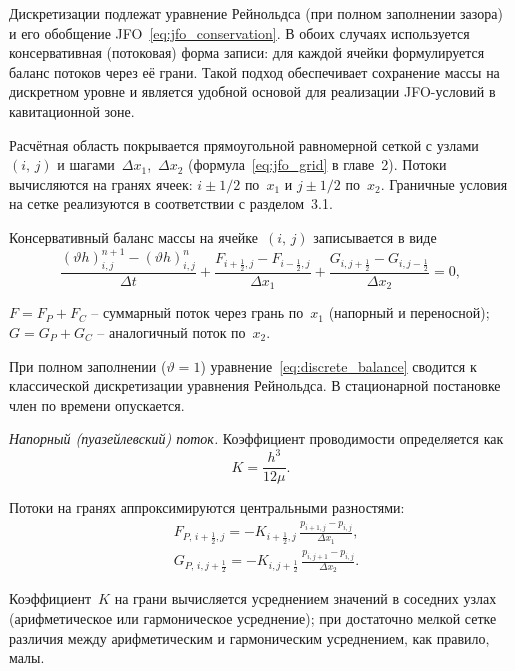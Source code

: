 Дискретизации подлежат уравнение Рейнольдса (при полном заполнении зазора) и его обобщение JFO~\eqref{eq:jfo_conservation}. В обоих случаях используется консервативная (потоковая) форма записи: для каждой ячейки формулируется баланс потоков через её грани. Такой подход обеспечивает сохранение массы на дискретном уровне и является удобной основой для реализации JFO-условий в кавитационной зоне.

Расчётная область покрывается прямоугольной равномерной сеткой с узлами~$(i,\,j)$ и шагами~$\Delta x_1$,~$\Delta x_2$ (формула~\eqref{eq:jfo_grid} в главе~2). Потоки вычисляются на гранях ячеек: $i \pm 1/2$ по~$x_1$ и $j \pm 1/2$ по~$x_2$. Граничные условия на сетке реализуются в соответствии с разделом~3.1.

Консервативный баланс массы на ячейке~$(i,\,j)$ записывается в виде
\begin{equation}\label{eq:discrete_balance}
  \frac{(\vartheta h)_{i,j}^{n+1} - (\vartheta h)_{i,j}^{n}}{\Delta t}
  + \frac{F_{i+\frac{1}{2},j} - F_{i-\frac{1}{2},j}}{\Delta x_1}
  + \frac{G_{i,j+\frac{1}{2}} - G_{i,j-\frac{1}{2}}}{\Delta x_2}
  = 0,
\end{equation}
\begin{conditions}
$F = F_P + F_C$ -- суммарный поток через грань по~$x_1$ (напорный и переносной);\\
$G = G_P + G_C$ -- аналогичный поток по~$x_2$.
\end{conditions}
При полном заполнении ($\vartheta = 1$) уравнение~\eqref{eq:discrete_balance} сводится к классической дискретизации уравнения Рейнольдса. В стационарной постановке член по времени опускается.

\textit{Напорный (пуазейлевский) поток.}
Коэффициент проводимости определяется как
\[
  K = \frac{h^3}{12\mu}.
\]

Потоки на гранях аппроксимируются центральными разностями:
\begin{equation}\label{eq:flux_poiseuille}
\begin{split}
  &F_{P,\,i+\frac{1}{2},j} = -K_{i+\frac{1}{2},j}\,
    \frac{p_{i+1,j} - p_{i,j}}{\Delta x_1}, \\
  &G_{P,\,i,j+\frac{1}{2}} = -K_{i,j+\frac{1}{2}}\,
    \frac{p_{i,j+1} - p_{i,j}}{\Delta x_2}.
\end{split}
\end{equation}

Коэффициент~$K$ на грани вычисляется усреднением значений в соседних узлах (арифметическое или гармоническое усреднение); при достаточно мелкой сетке различия между арифметическим и гармоническим усреднением, как правило, малы.

